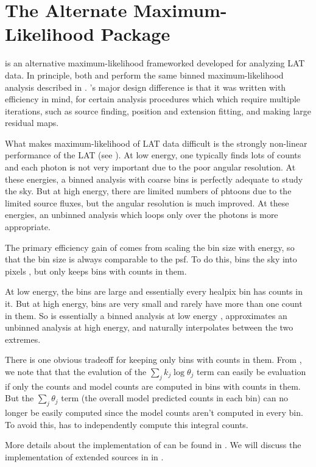 \section{The Alternate Maximum-Likelihood Package \pointlike}

\pointlike is an alternative maximum-likelihood frameworked developed
for analyzing \ac{LAT} data. In principle, both \pointlike and \gtlike
perform the same binned maximum-likelihood analysis described in
. \pointlike's major design difference
is that it was written with efficiency in mind, for certain analysis
procedures which which require multiple iterations, such as source
finding, position and extension fitting, and making large residual
\ts maps.

What makes maximum-likelihood of \ac{LAT} data difficult
is the strongly non-linear performance of the \ac{LAT} (see
). At low energy, one typically finds lots
of counts and each photon is not very important due to the poor angular
resolution. At these energies, a binned analysis with coarse bins is
perfectly adequate to study the sky.  But at high energy, there are
limited numbers of phtoons due to the limited source fluxes, but the
angular resolution is much improved.  At these energies, an unbinned
analysis which loops only over the photons is more appropriate.

The primary efficiency gain of \pointlike comes from scaling the bin
size with energy, so that the bin size is always comparable to the
\ac{psf}.  To do this, \pointlike bins the sky into \healpix pixels
\citep{gorski_2005_healpix:-framework}, but only keeps bins with counts
in them.

At low energy, the bins are large and essentially every healpix bin
has counts in it.  But at high energy, bins are very small and rarely
have more than one count in them.  So \pointlike is essentially a binned
analysis at low energy , approximates an unbinned analysis at high energy,
and naturally interpolates between the two extremes.

There is one obvious tradeoff for keeping only bins with counts in them.
From , we note that that the evalution
of the $\sum_j k_j\log\theta_j$ term can easily be evaluation if only
the counts and model counts are computed in bins with counts in them.
But the $\sum_j \theta_j$ term (the overall model predicted counts in
each bin) can no longer be easily computed since the model counts aren't
computed in every bin. To avoid this, \pointlike has to independently
compute this integral counts.

More details about the implementation of \pointlike can be found in
\cite{kerr_2010a_likelihood-methods}. We will discuss the implementation
of extended sources in \pointlike in .

